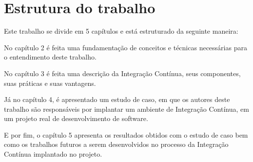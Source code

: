 \section{Estrutura do trabalho}

Este trabalho se divide em 5 capítulos e está estruturado da seguinte maneira:

No capítulo 2 é feita uma fundamentação de conceitos e técnicas necessárias para o entendimento deste trabalho.

No capítulo 3 é feita uma descrição da Integração Contínua, seus componentes, suas práticas e suas vantagens.

Já no capítulo 4, é apresentado um estudo de caso, em que os autores deste trabalho são responsáveis por implantar um ambiente de Integração Contínua, em um projeto real de desenvolvimento de software.

E por fim, o capítulo 5 apresenta os resultados obtidos com o estudo de caso bem como os trabalhos futuros a serem desenvolvidos no processo da Integração Contínua implantado no projeto.

